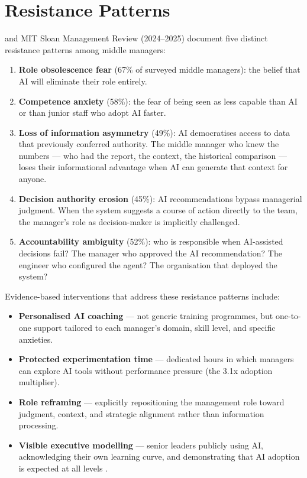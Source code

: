 \section{Resistance Patterns}

\textcite{Capgemini2025} and MIT Sloan Management Review (2024--2025) document five distinct resistance patterns among middle managers:

\begin{enumerate}
  \item \textbf{Role obsolescence fear} (67\% of surveyed middle managers): the belief that AI will eliminate their role entirely.
  \item \textbf{Competence anxiety} (58\%): the fear of being seen as less capable than AI or than junior staff who adopt AI faster.
  \item \textbf{Loss of information asymmetry} (49\%): AI democratises access to data that previously conferred authority. The middle manager who knew the numbers --- who had the report, the context, the historical comparison --- loses their informational advantage when AI can generate that context for anyone.
  \item \textbf{Decision authority erosion} (45\%): AI recommendations bypass managerial judgment. When the system suggests a course of action directly to the team, the manager's role as decision-maker is implicitly challenged.
  \item \textbf{Accountability ambiguity} (52\%): who is responsible when AI-assisted decisions fail? The manager who approved the AI recommendation? The engineer who configured the agent? The organisation that deployed the system?
\end{enumerate}

\begin{cautionbox}[title={Effective Interventions}]
Evidence-based interventions that address these resistance patterns include:
\begin{itemize}
  \item \textbf{Personalised AI coaching} --- not generic training programmes, but one-to-one support tailored to each manager's domain, skill level, and specific anxieties.
  \item \textbf{Protected experimentation time} --- dedicated hours in which managers can explore AI tools without performance pressure (the 3.1x adoption multiplier).
  \item \textbf{Role reframing} --- explicitly repositioning the management role toward judgment, context, and strategic alignment rather than information processing.
  \item \textbf{Visible executive modelling} --- senior leaders publicly using AI, acknowledging their own learning curve, and demonstrating that AI adoption is expected at all levels \parencite{Mollick2025Management}.
\end{itemize}
\end{cautionbox}


